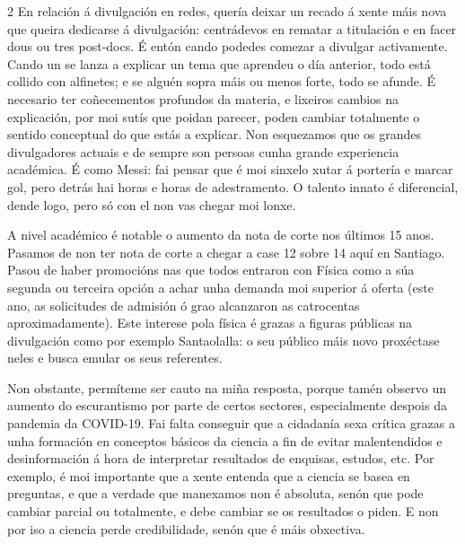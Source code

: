 \begin{multicols}{2}
En relación á divulgación en redes, quería deixar un recado á xente máis nova
que queira dedicarse á divulgación: centrádevos en rematar a titulación
e en facer dous ou tres post-docs. É entón cando podedes comezar a divulgar
activamente. Cando un se lanza a explicar un tema que aprendeu o día anterior,
todo está collido con alfinetes; e se alguén sopra máis ou menos forte, todo se
afunde. É necesario ter coñecementos profundos da materia, e lixeiros
cambios na explicación, por moi sutís que poidan parecer, poden cambiar
totalmente o sentido conceptual do que estás a explicar. Non esquezamos que os
grandes divulgadores actuais e de sempre son persoas cunha grande experiencia
académica. É como Messi: fai pensar que é moi sinxelo xutar á portería e marcar
gol, pero detrás hai horas e horas de adestramento. O talento innato é
diferencial, dende logo, pero só con el non vas chegar moi lonxe.


A nivel académico é notable o aumento da nota de corte nos últimos 15 anos.
Pasamos de non ter nota de corte a chegar a case 12 sobre 14 aquí en
Santiago. Pasou de haber promocións nas que todos entraron con Física como a
súa segunda ou terceira opción a achar unha demanda moi superior á oferta (este
ano, as solicitudes de admisión ó grao alcanzaron as catrocentas
aproximadamente). Este interese pola física é grazas a figuras públicas na
divulgación como por exemplo Santaolalla: o seu público máis novo proxéctase
neles e busca emular os seus referentes.

Non obstante, permíteme ser cauto na miña resposta, porque tamén observo un
aumento do escurantismo por parte de certos sectores, especialmente despois da
pandemia da COVID-19. Fai falta conseguir que a cidadanía sexa crítica
grazas a unha formación en conceptos básicos da ciencia a fin de evitar
malentendidos e desinformación á hora de interpretar resultados de enquisas,
estudos, etc. Por exemplo, é moi importante que a xente entenda que a
ciencia se basea en preguntas, e que a verdade que manexamos non é
absoluta, senón que pode cambiar parcial ou totalmente, e debe cambiar se os
resultados o piden. E non por iso a ciencia perde credibilidade, senón que é
máis obxectiva.


\end{multicols}
